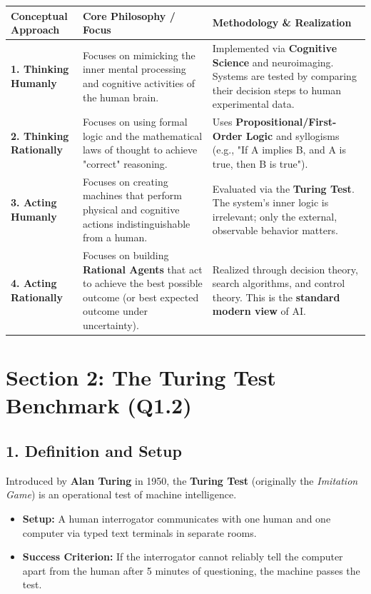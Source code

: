 \begin{table}[H]
\centering
\begin{tabular}{|p{}|p{}|p{}|}
\hline
Conceptual Approach & Core Philosophy / Focus & Methodology \& Realization \\
\hline
\textbf{1. Thinking Humanly} & Focuses on mimicking the inner mental processing and cognitive activities of the human brain. & Implemented via \textbf{Cognitive Science} and neuroimaging. Systems are tested by comparing their decision steps to human experimental data. \\
\hline
\textbf{2. Thinking Rationally} & Focuses on using formal logic and the mathematical laws of thought to achieve "correct" reasoning. & Uses \textbf{Propositional/First-Order Logic} and syllogisms (e.g., "If A implies B, and A is true, then B is true"). \\
\hline
\textbf{3. Acting Humanly} & Focuses on creating machines that perform physical and cognitive actions indistinguishable from a human. & Evaluated via the \textbf{Turing Test}. The system's inner logic is irrelevant; only the external, observable behavior matters. \\
\hline
\textbf{4. Acting Rationally} & Focuses on building \textbf{Rational Agents} that act to achieve the best possible outcome (or best expected outcome under uncertainty). & Realized through decision theory, search algorithms, and control theory. This is the \textbf{standard modern view} of AI. \\
\hline
\end{tabular}
\end{table}


\section{Section 2: The Turing Test Benchmark (Q1.2)}

\subsection{1. Definition and Setup}
Introduced by \textbf{Alan Turing} in 1950, the \textbf{Turing Test} (originally the \textit{Imitation Game}) is an operational test of machine intelligence. 

\begin{itemize}
  \item   \textbf{Setup:} A human interrogator communicates with one human and one computer via typed text terminals in separate rooms.
  \item   \textbf{Success Criterion:} If the interrogator cannot reliably tell the computer apart from the human after 5 minutes of questioning, the machine passes the test.
\end{itemize}

